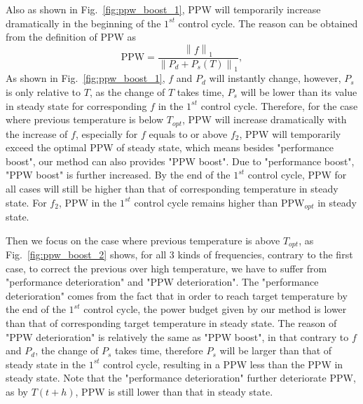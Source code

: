 Also as shown in Fig.~\ref{fig:ppw_boost_1}, PPW will temporarily increase dramatically in the beginning of the $1^{st}$ control cycle. The reason can be obtained from the definition of PPW as
\begin{equation}\label{eq:ppw_detail}
\text{PPW} = \frac{\left \| f \right \|_{1}}{\left \| P_{d}+P_{s}(T) \right \|_{1}},
\end{equation}
As shown in Fig.~\ref{fig:ppw_boost_1}, $f$ and $P_{d}$ will instantly change, however, $P_{s}$ is only relative to $T$, as the change of $T$ takes time, $P_{s}$ will be lower than its value in steady state for corresponding $f$ in the $1^{st}$ control cycle. Therefore, for the case where previous temperature is below $T_{opt}$, PPW will increase dramatically with the increase of $f$, especially for $f$ equals to or above $f_{2}$, PPW will temporarily exceed the optimal PPW of steady state, which means besides "performance boost", our method can also provides "PPW boost". Due to "performance boost", "PPW boost" is further increased. By the end of the $1^{st}$ control cycle, PPW for all cases will still be higher than that of corresponding temperature in steady state. For $f_{2}$, PPW in the $1^{st}$ control cycle remains higher than $\text{PPW}_{opt}$ in steady state.



Then we focus on the case where previous temperature is above $T_{opt}$, as Fig.~\ref{fig:ppw_boost_2} shows, for all $3$ kinds of frequencies, contrary to the first case, to correct the previous over high temperature, we have to suffer from "performance deterioration" and "PPW deterioration". The "performance deterioration" comes from the fact that in order to reach target temperature by the end of the $1^{st}$ control cycle, the power budget given by our method is lower than that of corresponding target temperature in steady state. The reason of "PPW deterioration" is relatively the same as "PPW boost", in that contrary to $f$ and $P_{d}$, the change of $P_{s}$ takes time, therefore $P_{s}$ will be larger than that of steady state in the $1^{st}$ control cycle, resulting in a PPW less than the PPW in steady state. Note that the "performance deterioration" further deteriorate PPW, as by $T(t+h)$, PPW is still lower than that in steady state.


